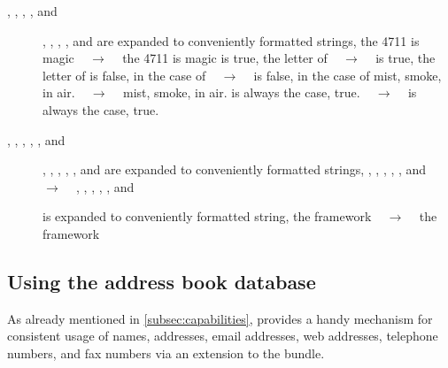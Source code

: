 \begin{description}
\item[\latexcmd{\No{}}, \latexcmd{\CF{}}, \latexcmd{\EG{}}, \latexcmd{\ETC{}}, and \latexcmd{\IE{}}] \enforcenewline%
  \latexcmd{\No{}}, \latexcmd{\CF{}}, \latexcmd{\EG{}}, \latexcmd{\ETC{}}, and \latexcmd{\IE{}}
  are expanded to conveniently formatted strings, \EG{} \newline
  the \latexcmd{\No{}} 4711 is magic           ~ $\rightarrow$ ~  the \No{} 4711 is magic \newline
  is true, \latexcmd{\CF{}} the letter of      ~ $\rightarrow$ ~  is true, \CF{} the letter of \newline
  is false, \latexcmd{\EG{}} in the case of    ~ $\rightarrow$ ~  is false, \EG{} in the case of \newline
  mist, smoke, \latexcmd{\ETC{}} in air.       ~ $\rightarrow$ ~  mist, smoke, \ETC{} in air. \newline
  is always the case, \latexcmd{\IE{}} true.   ~ $\rightarrow$ ~  is always the case, \IE{} true.

\item[\latexcmd{\pdfTeX{}}, \latexcmd{\pdfLaTeX{}}, \latexcmd{\TeXLive{}}, \latexcmd{\MiKTeX{}}, \latexcmd{\AUCTeX{}}, and \latexcmd{\texmf{}}] \enforcenewline%
  \latexcmd{\pdfTeX{}}, \latexcmd{\pdfLaTeX{}}, \latexcmd{\TeXLive{}}, \latexcmd{\MiKTeX{}}, \latexcmd{\AUCTeX{}}, and \latexcmd{\texmf{}}
  are expanded to conveniently formatted strings, \EG{} \newline
  \latexcmd{\pdfTeX{}}, \latexcmd{\pdfLaTeX{}}, \latexcmd{\TeXLive{}}, \latexcmd{\MiKTeX{}}, \latexcmd{\AUCTeX{}}, and \latexcmd{\texmf{}}
  ~ $\rightarrow$ ~
  \pdfTeX{}, \pdfLaTeX{}, \TeXLive{}, \MiKTeX{}, \AUCTeX{}, and \texmf{}

\item[\latexcmd{\wegcLaTeX{}}] \enforcenewline%
  \latexcmd{\wegcLaTeX{}} is expanded to conveniently formatted string, \EG{} \newline
  the \latexcmd{\wegcLaTeX{}} framework  ~ $\rightarrow$ ~ the \wegcLaTeX{} framework
\end{description}


\subsection[Address book database]{Using the address book database}
\label{subsec:usingTheAddressBookDatabase}

As already mentioned in \autoref{subsec:capabilities}, \wegcLaTeX{}
provides a handy mechanism for consistent usage of names, addresses, email
addresses, web addresses, telephone numbers, and fax numbers via an
extension to the \KOMAScript{} bundle.

